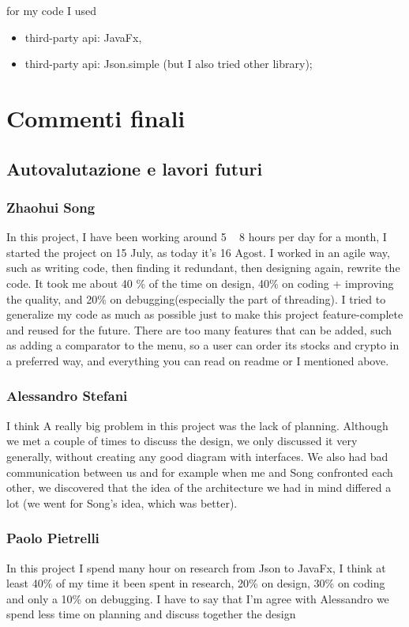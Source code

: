 \documentclass[a4paper,12pt]{report}
\begin{document}
for my code I used
\begin{itemize}
    \item third-party api: JavaFx,
    \item third-party api: Json.simple (but I also tried other library);
\end{itemize}


\chapter{Commenti finali}

\section{Autovalutazione e lavori futuri}

\subsection*{Zhaohui Song}
In this project, I have been working around 5 ~ 8 hours per day for a month, I started the project on 15 July,  as today it's 16 Agost.
%
I worked in an agile way, such as writing code, then finding it redundant, then designing again, rewrite the code. 
%
It took me about 40 \% of the time on design, 40\% on coding + improving the quality, and 20\% on debugging(especially the part of threading). 
%
I tried to generalize my code as much as possible just to make this project feature-complete and reused for the future. 
%
There are too many features that can be added, such as adding a comparator to the menu, so a user can order its stocks and crypto in a preferred way, and everything you can read on readme or I mentioned above.  

\subsection*{Alessandro Stefani}
I think A really big problem in this project was the lack of planning. Although we met a couple of times to discuss the design, we only discussed it very generally, without creating any good diagram with interfaces. We also had bad communication between us and for example when me and Song confronted each other, we discovered that the idea of the architecture we had in mind differed a lot (we went for Song's idea, which was better).

\subsection*{Paolo Pietrelli}
In this project I spend many hour on research from Json to JavaFx, I think at least 40\% of my time it been spent in research, 20\% on design, 30\% on coding and only a 10\% on debugging.
I have to say that I'm agree with Alessandro we spend less time on planning and discuss together the design 
\end{document}

